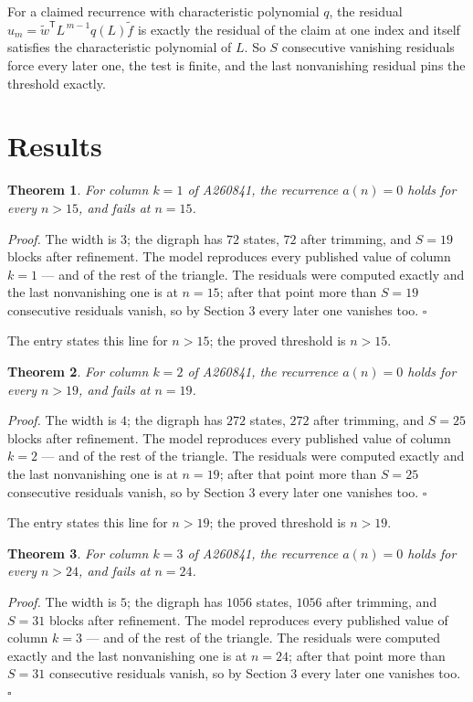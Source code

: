 \documentclass[11pt]{article}
\newtheorem{theorem}{Theorem}
\theoremstyle{definition}
\begin{document}
For a claimed recurrence with characteristic polynomial $q$, the residual $u_m = \tilde w^{\mathsf T}L^{\,m-1}q(L)\tilde f$ is exactly the residual of the claim at one index and itself satisfies the characteristic polynomial of $L$. So $S$ consecutive vanishing residuals force every later one, the test is finite, and the last nonvanishing residual pins the threshold exactly.

\section{Results}

\begin{theorem} For column $k = 1$ of A260841, the recurrence $a(n) = 0$ holds for every $n > 15$, and fails at $n = 15$.\end{theorem}

{\itshape Proof.} The width is $3$; the digraph has $72$ states, $72$ after trimming, and $S = 19$ blocks after refinement. The model reproduces every published value of column $k = 1$ --- and of the rest of the triangle. The residuals were computed exactly and the last nonvanishing one is at $n = 15$; after that point more than $S = 19$ consecutive residuals vanish, so by Section 3 every later one vanishes too. $\square$

The entry states this line for $n > 15$; the proved threshold is $n > 15$.

\begin{theorem} For column $k = 2$ of A260841, the recurrence $a(n) = 0$ holds for every $n > 19$, and fails at $n = 19$.\end{theorem}

{\itshape Proof.} The width is $4$; the digraph has $272$ states, $272$ after trimming, and $S = 25$ blocks after refinement. The model reproduces every published value of column $k = 2$ --- and of the rest of the triangle. The residuals were computed exactly and the last nonvanishing one is at $n = 19$; after that point more than $S = 25$ consecutive residuals vanish, so by Section 3 every later one vanishes too. $\square$

The entry states this line for $n > 19$; the proved threshold is $n > 19$.

\begin{theorem} For column $k = 3$ of A260841, the recurrence $a(n) = 0$ holds for every $n > 24$, and fails at $n = 24$.\end{theorem}

{\itshape Proof.} The width is $5$; the digraph has $1056$ states, $1056$ after trimming, and $S = 31$ blocks after refinement. The model reproduces every published value of column $k = 3$ --- and of the rest of the triangle. The residuals were computed exactly and the last nonvanishing one is at $n = 24$; after that point more than $S = 31$ consecutive residuals vanish, so by Section 3 every later one vanishes too. $\square$
\end{document}
